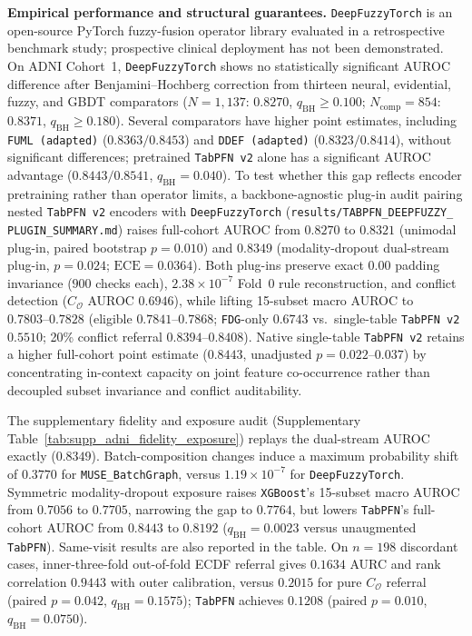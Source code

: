 \documentclass[10pt,twocolumn]{article}
\begin{document}
\noindent\textbf{Empirical performance and structural guarantees.}
\texttt{DeepFuzzyTorch} is an open-source PyTorch fuzzy-fusion operator library evaluated in a
retrospective benchmark study; prospective clinical deployment has not been demonstrated.
On ADNI Cohort~1, \texttt{DeepFuzzyTorch} shows no statistically significant AUROC difference
after Benjamini--Hochberg correction from thirteen neural, evidential, fuzzy, and GBDT
comparators ($N=1,137$: $0.8270$, $q_{\text{BH}}\ge0.100$; $N_{\text{comp}}=854$: $0.8371$,
$q_{\text{BH}}\ge0.180$). Several comparators have higher point estimates, including
\texttt{FUML (adapted)} ($0.8363/0.8453$) and \texttt{DDEF (adapted)} ($0.8323/0.8414$),
without significant differences; pretrained \texttt{TabPFN~v2} alone has a significant AUROC
advantage ($0.8443/0.8541$, $q_{\text{BH}}=0.040$).
To test whether this gap reflects encoder pretraining rather than operator limits, a
backbone-agnostic plug-in audit pairing nested \texttt{TabPFN~v2} encoders with
\texttt{DeepFuzzyTorch} (\texttt{results/\allowbreak TABPFN\_\allowbreak DEEPFUZZY\_\allowbreak
PLUGIN\_\allowbreak SUMMARY.md}) raises full-cohort AUROC from $0.8270$ to $0.8321$
(unimodal plug-in, paired bootstrap $p=0.010$) and $0.8349$ (modality-dropout dual-stream
plug-in, $p=0.024$; $\text{ECE}=0.0364$). Both plug-ins preserve exact $0.00$ padding
invariance ($900$ checks each), $2.38\times 10^{-7}$ Fold~0 rule reconstruction, and conflict
detection ($C_{\mathcal{O}}$ AUROC $0.6946$), while lifting 15-subset macro AUROC to
$0.7803\text{--}0.7828$ (eligible $0.7841\text{--}0.7868$; \texttt{FDG}-only $0.6743$ vs.\
single-table \texttt{TabPFN~v2} $0.5510$; 20\% conflict referral $0.8394\text{--}0.8408$).
Native single-table \texttt{TabPFN~v2} retains a higher full-cohort point estimate ($0.8443$,
unadjusted $p=0.022\text{--}0.037$) by concentrating in-context capacity on joint feature
co-occurrence rather than decoupled subset invariance and conflict auditability.

The supplementary fidelity and exposure audit (Supplementary
Table~\ref{tab:supp_adni_fidelity_exposure})
replays the dual-stream AUROC exactly ($0.8349$). Batch-composition changes induce a maximum
probability shift of $0.3770$ for \texttt{MUSE\_BatchGraph}, versus $1.19\times10^{-7}$ for
\texttt{DeepFuzzyTorch}. Symmetric modality-dropout exposure raises \texttt{XGBoost}'s
15-subset macro AUROC from $0.7056$ to $0.7705$, narrowing the gap to $0.7764$, but lowers
\texttt{TabPFN}'s full-cohort AUROC from $0.8443$ to $0.8192$ ($q_{\mathrm{BH}}=0.0023$
versus unaugmented \texttt{TabPFN}). Same-visit results are also reported in the table. On
$n=198$ discordant cases, inner-three-fold out-of-fold ECDF referral gives $0.1634$ AURC and
rank correlation $0.9443$ with outer calibration, versus $0.2015$ for pure $C_{\mathcal O}$
referral (paired $p=0.042$, $q_{\mathrm{BH}}=0.1575$); \texttt{TabPFN} achieves $0.1208$
(paired $p=0.010$, $q_{\mathrm{BH}}=0.0750$).
\end{document}
